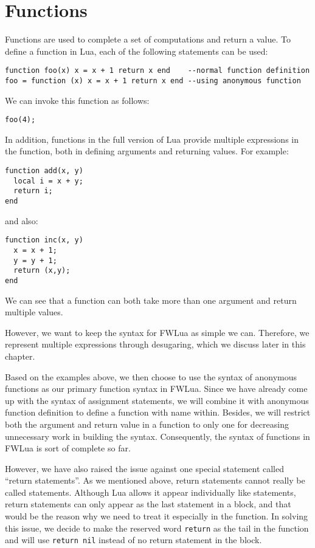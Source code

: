 \section{Functions}
Functions are used to complete a set of computations and return a value.
To define a function in Lua, each of the following statements can be used:
\begin{verbatim}
function foo(x) x = x + 1 return x end    --normal function definition
foo = function (x) x = x + 1 return x end --using anonymous function
\end{verbatim}
We can invoke this function as follows:
\begin{verbatim}
foo(4);
\end{verbatim}
In addition, functions in the full version of Lua provide multiple expressions in the function, both in defining arguments and returning values. For example:
\begin{verbatim}
function add(x, y)
  local i = x + y;
  return i;
end
\end{verbatim}
and also:
\begin{verbatim}
function inc(x, y)
  x = x + 1;
  y = y + 1;
  return (x,y);
end
\end{verbatim}
We can see that a function can both take more than one argument and return multiple values.

However, we want to keep the syntax for FWLua as simple we can. Therefore, we represent multiple expressions through desugaring, which we discuss later in this chapter.

Based on the examples above, we then choose to use the syntax of anonymous functions as our primary function syntax in FWLua. Since we have already come up with the syntax of assignment statements, we will combine it with anonymous function definition to define a function with name within. Besides, we will restrict both the argument and return value in a function to only one for decreasing unnecessary work in building the syntax. Consequently, the syntax of functions in FWLua is sort of complete so far.

However, we have also raised the issue against one special statement called ``return statements''. As we mentioned above, return statements cannot really be called statements. Although Lua allows it appear individually like statements, return statements can only appear as the last statement in a block, and that would be the reason why we need to treat it especially in the function. In solving this issue, we decide to make the reserved word {\tt return} as the tail in the function and will use {\tt return nil} instead of no return statement in the block.

